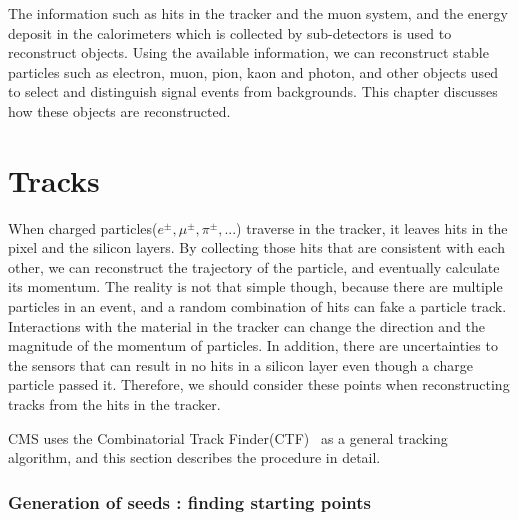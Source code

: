 
The information such as hits in the tracker and the muon system,
and the energy deposit in the calorimeters which is collected by 
sub-detectors is used to reconstruct objects. Using the available 
information, we can reconstruct stable particles such as 
electron, muon, pion, kaon and photon, and other objects 
used to select and distinguish signal events from backgrounds. 
This chapter discusses how these objects are reconstructed. 

\section{ Tracks }
\label{sec:track}

When charged particles($e^\pm, \mu^\pm, \pi^\pm, ... $) traverse in the tracker,
it leaves hits in the pixel and the silicon layers. By collecting those hits
that are consistent with each other, we can reconstruct the 
trajectory of the particle, and eventually calculate its momentum. 
The reality is not that simple though, because there are multiple 
particles in an event, and a random combination of hits can fake a particle track.  
Interactions with the material in the tracker can change the 
direction and the magnitude of the momentum of particles. 
In addition, there are uncertainties to the sensors that 
can result in no hits in a silicon layer even though a charge 
particle passed it. Therefore, we should consider these points 
when reconstructing tracks from the hits in the tracker. 

CMS uses the Combinatorial Track Finder(CTF)~\cite{Adam:934067} as a general tracking 
algorithm, and this section describes the procedure in detail.


\subsubsection{Generation of seeds : finding starting points}

